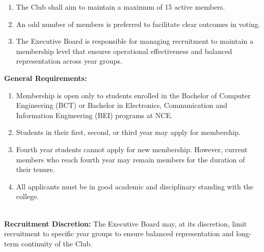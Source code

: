 

\begin{enumerate}[label=\alph*), leftmargin=2em, itemsep=0.3em]
    \item The Club shall aim to maintain a maximum of 15 active members.
    \item An odd number of members is preferred to facilitate clear outcomes in voting.
    \item The Executive Board is responsible for managing recruitment to maintain a membership level that ensures operational effectiveness and balanced representation across year groups.
\end{enumerate}


\textbf{General Requirements:}
\begin{enumerate}[label=\alph*), leftmargin=2em, itemsep=0.3em]
    \item Membership is open only to students enrolled in the Bachelor of Computer Engineering (BCT) or Bachelor in Electronics, Communication and Information Engineering (BEI) programs at NCE.
    \item Students in their first, second, or third year may apply for membership.
    \item Fourth year students cannot apply for new membership. However, current members who reach fourth year may remain members for the duration of their tenure.
    \item All applicants must be in good academic and disciplinary standing with the college.
\end{enumerate}
\\
\textbf{Recruitment Discretion:}
The Executive Board may, at its discretion, limit recruitment to specific year groups to ensure balanced representation and long-term continuity of the Club.


